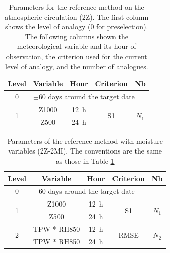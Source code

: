 \documentclass[hess, manuscript]{copernicus}
\begin{document}
	
	\clearpage

	
	\begin{table}[htb]
		\caption{Parameters for the reference method on the atmospheric circulation (2Z). The first column shows the level of analogy (0 for preselection). The following columns shown the meteorological variable and its hour of observation, the criterion used for the current level of analogy, and the number of analogues.}
		\footnotesize
		\begin{center}
			\begin{tabular}{ccccc}
				\hline
				Level & Variable & Hour & Criterion & Nb \\ 
				\hline 
				0 & \multicolumn{4}{l}{$\pm 60$ days around the target date} \\
				\hline 
				\multirow{2}{*}{1} & Z1000 & 12~h & \multirow{2}{*}{S1} & \multirow{2}{*}{$N_{1}$} \\
				& Z500 & 24~h & & \\ 
				\hline 
			\end{tabular} 
		\end{center}
		\label{table:method_2Z}
	\end{table}

	\begin{table}[htb]
		\caption{Parameters of the reference method with moisture variables (2Z-2MI). The conventions are the same as those in Table \ref{table:method_2Z}}
		\footnotesize
		\begin{center}
			\begin{tabular}{ccccc}
				\hline 
				Level & Variable & Hour & Criterion & Nb \\ 
				\hline 
				0 & \multicolumn{4}{l}{$\pm 60$ days around the target date} \\
				\hline 
				\multirow{2}{*}{1} & Z1000 & 12~h & \multirow{2}{*}{S1} & \multirow{2}{*}{$N_{1}$} \\
				& Z500 & 24~h & & \\ 
				\hline
				\multirow{2}{*}{2} & TPW * RH850 & 12~h & \multirow{2}{*}{RMSE} & \multirow{2}{*}{$N_{2}$} \\
				& TPW * RH850 & 24~h & & \\ 
				\hline 
			\end{tabular} 
		\end{center}
		\label{table:method_2Z-2MI}
	\end{table}

	
	
\end{document}
